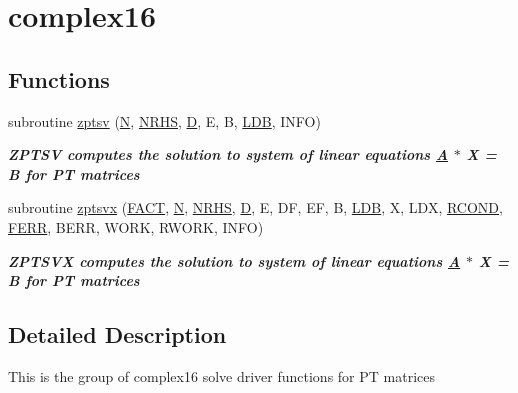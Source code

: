 \hypertarget{group__complex16PTsolve}{}\section{complex16}
\label{group__complex16PTsolve}
\subsection*{Functions}
\begin{DoxyCompactItemize}
\item 
subroutine \hyperlink{group__complex16PTsolve_ga032a35206cb94896480a1fbfdba46809}{zptsv} (\hyperlink{polmisc_8c_a0240ac851181b84ac374872dc5434ee4}{N}, \hyperlink{example__user_8c_aa0138da002ce2a90360df2f521eb3198}{N\+R\+H\+S}, \hyperlink{odrpack_8h_a7dae6ea403d00f3687f24a874e67d139}{D}, E, B, \hyperlink{example__user_8c_a50e90a7104df172b5a89a06c47fcca04}{L\+D\+B}, I\+N\+F\+O)
\begin{DoxyCompactList}\small\item\em {\bfseries  Z\+P\+T\+S\+V computes the solution to system of linear equations \hyperlink{classA}{A} $\ast$ X = B for P\+T matrices} \end{DoxyCompactList}\item 
subroutine \hyperlink{group__complex16PTsolve_gafa2092d5080ff55f1dccd0eff869d286}{zptsvx} (\hyperlink{superlu__enum__consts_8h_af00a42ecad444bbda75cde1b64bd7e72a1b6692b56d378abb85bd49063721d034}{F\+A\+C\+T}, \hyperlink{polmisc_8c_a0240ac851181b84ac374872dc5434ee4}{N}, \hyperlink{example__user_8c_aa0138da002ce2a90360df2f521eb3198}{N\+R\+H\+S}, \hyperlink{odrpack_8h_a7dae6ea403d00f3687f24a874e67d139}{D}, E, D\+F, E\+F, B, \hyperlink{example__user_8c_a50e90a7104df172b5a89a06c47fcca04}{L\+D\+B}, X, L\+D\+X, \hyperlink{superlu__enum__consts_8h_af00a42ecad444bbda75cde1b64bd7e72a9b5c151728d8512307565994c89919d5}{R\+C\+O\+N\+D}, \hyperlink{superlu__enum__consts_8h_af00a42ecad444bbda75cde1b64bd7e72a78fd14d7abebae04095cfbe02928f153}{F\+E\+R\+R}, B\+E\+R\+R, W\+O\+R\+K, R\+W\+O\+R\+K, I\+N\+F\+O)
\begin{DoxyCompactList}\small\item\em {\bfseries  Z\+P\+T\+S\+V\+X computes the solution to system of linear equations \hyperlink{classA}{A} $\ast$ X = B for P\+T matrices} \end{DoxyCompactList}\end{DoxyCompactItemize}


\subsection{Detailed Description}
This is the group of complex16 solve driver functions for P\+T matrices 

